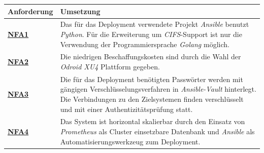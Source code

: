 \documentclass[titlepage]{report}
\begin{document}
\begin{center}
    \begin{tabu}{X[-1] X}
\toprule
\textbf{Anforderung} & \textbf{Umsetzung}  \\
\midrule
        \hyperref[table:NFA1]{\textbf{NFA1}} & Das für das Deployment verwendete Projekt \emph{Ansible} benutzt \emph{Python}. Für die Erweiterung um \emph{CIFS}\hyp{}Support ist nur die Verwendung der Programmiersprache \emph{Golang} möglich. \\
        \hyperref[table:NFA2]{\textbf{NFA2}} & Die niedrigen Beschaffungskosten sind durch die Wahl der \emph{Odroid XU4} Plattform gegeben. \\
        \hyperref[table:NFA3]{\textbf{NFA3}} & Die für das Deployment benötigten Passwörter werden mit gängigen Verschlüsselungsverfahren in \emph{Ansible-Vault}  hinterlegt. Die Verbindungen zu den Zielsystemen finden verschlüsselt und mit einer Authentizitätsprüfung statt. \\
        \hyperref[table:NFA4]{\textbf{NFA4}} & Das System ist horizontal skalierbar durch den Einsatz von \emph{Prometheus} als Cluster einsetzbare Datenbank und \emph{Ansible} als Automatisierungswerkzeug zum Deployment. \\
\bottomrule
    \end{tabu}
    \label{table:mapping2}
\end{center}
\end{document}
